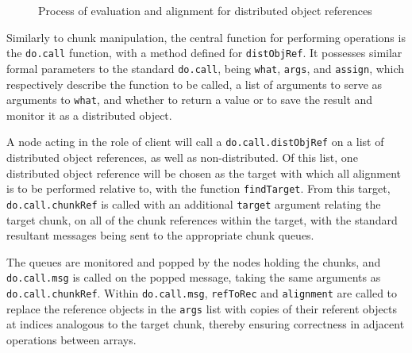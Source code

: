 \documentclass[a4paper,10pt]{article}
\begin{document}
\begin{figure}
	\caption{\label{fig:distobj}Process of evaluation and alignment for
	distributed object references}
\end{figure}

Similarly to chunk manipulation, the central function for performing operations
is the \lstinline[language=R]{do.call} function, with a method defined for
\texttt{distObjRef}. It possesses similar formal parameters to the standard
\lstinline[language=R]{do.call}, being \texttt{what}, \texttt{args}, and
\texttt{assign}, which respectively describe the function to be called, a list
of arguments to serve as arguments to \texttt{what}, and whether to return a
value or to save the result and monitor it as a distributed object.

A node acting in the role of client will call a
\lstinline[language=R]{do.call.distObjRef} on a list of distributed object
references, as well as non-distributed.
Of this list, one distributed object reference will be chosen as the target
with which all alignment is to be performed relative to, with the function
\lstinline[language=R]{findTarget}.
From this target, \lstinline[language=R]{do.call.chunkRef} is called with an
additional \texttt{target} argument relating the target chunk, on all of the
chunk references within the target, with the standard resultant messages being
sent to the appropriate chunk queues.

The queues are monitored and popped by the nodes holding the chunks, and
\lstinline[language=R]{do.call.msg} is called on the popped message, taking the
same arguments as \lstinline[language=R]{do.call.chunkRef}.
Within \lstinline[language=R]{do.call.msg}, \lstinline[language=R]{refToRec}
and \lstinline[language=R]{alignment} are called to replace the reference
objects in the \texttt{args} list with copies of their referent objects at
indices analogous to the target chunk, thereby ensuring correctness in
adjacent operations between arrays.
\end{document}
